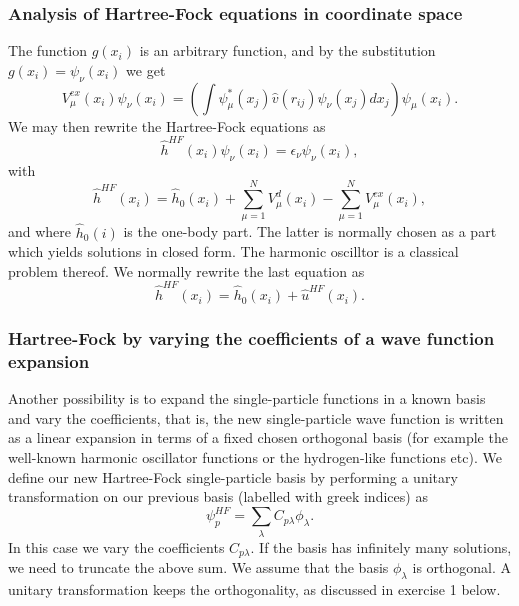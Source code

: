 \documentclass{beamer}
\begin{document}
\begin{frame}
\frametitle{Analysis of Hartree-Fock equations in coordinate space}

\begin{block}{}
The function $g(x_i)$ is an arbitrary function,
and by the substitution $g(x_i) = \psi_{\nu}(x_i)$
we get
\begin{equation*}
  V_{\mu}^{ex}(x_i) \psi_{\nu}(x_i) 
  = \left(\int \psi_{\mu}^*(x_j) 
 \hat{v}(r_{ij})\psi_{\nu}(x_j)
  dx_j\right)\psi_{\mu}(x_i).
\end{equation*}
We may then rewrite the Hartree-Fock equations as
\[
  \hat{h}^{HF}(x_i) \psi_{\nu}(x_i) = \epsilon_{\nu}\psi_{\nu}(x_i),
\]
with
\[
  \hat{h}^{HF}(x_i)= \hat{h}_0(x_i) + \sum_{\mu=1}^NV_{\mu}^{d}(x_i) -
  \sum_{\mu=1}^NV_{\mu}^{ex}(x_i),
\]
and where $\hat{h}_0(i)$ is the one-body part. The latter is normally chosen as a part which yields solutions in closed form. The harmonic oscilltor is a classical problem thereof.
We normally rewrite the last equation as
\[
  \hat{h}^{HF}(x_i)= \hat{h}_0(x_i) + \hat{u}^{HF}(x_i). 
\]
\end{block}
\end{frame}

\begin{frame}
\frametitle{Hartree-Fock by varying the coefficients of a wave function expansion}

\begin{block}{}
Another possibility is to expand the single-particle functions in a known basis  and vary the coefficients, 
that is, the new single-particle wave function is written as a linear expansion
in terms of a fixed chosen orthogonal basis (for example the well-known harmonic oscillator functions or the hydrogen-like functions etc).
We define our new Hartree-Fock single-particle basis by performing a unitary transformation 
on our previous basis (labelled with greek indices) as
\begin{equation}
\psi_p^{HF}  = \sum_{\lambda} C_{p\lambda}\phi_{\lambda}. \label{eq:newbasis}
\end{equation}
In this case we vary the coefficients $C_{p\lambda}$. If the basis has infinitely many solutions, we need
to truncate the above sum.  We assume that the basis $\phi_{\lambda}$ is orthogonal. A unitary transformation keeps the orthogonality, as discussed in exercise 1 below.  
\end{block}
\end{frame}
\end{document}
